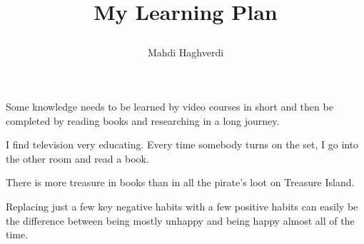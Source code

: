 \documentclass[12pt, dvipsnames, svgnames, x11names, oneside]{book}
\title{\roundpic[xshift=-3mm,yshift=-5mm]{5.8cm}{9cm}{./images/lamp}\vspace{3mm}
	
	My Learning Plan
}
\author{Mahdi Haghverdi}
\begin{document}
	\maketitle
	\frontmatter
	\tableofcontents
	\clearpage
	
	\mainmatter		
	
	\begin{savequote}[80mm]
		Some knowledge needs to be learned by video courses in short and then be completed by reading books and researching in a long journey.
	\end{savequote}
		
	
	\begin{savequote}[80mm]
		I find television very educating. Every time somebody turns on the set, I go into the other room and read a book.
		
		There is more treasure in books than in all the pirate’s loot on Treasure Island.
	\end{savequote}
		
	
	\begin{savequote}[80mm]
		Replacing just a few key negative habits with a few positive habits can easily be the difference between being mostly unhappy and being happy almost all of the time.
	\end{savequote}
	
	
\end{document}
